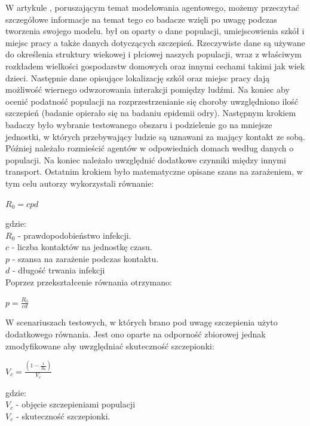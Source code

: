 W artykule \cite{bib:artykul1}, poruszającym temat modelowania agentowego, możemy przeczytać szczegółowe informacje na temat tego co badacze wzięli po uwagę podczas tworzenia swojego modelu.
był on oparty o dane populacji, umiejscowienia szkół i miejsc pracy a także danych dotyczących szczepień. Rzeczywiste dane są używane do określenia struktury wiekowej i płciowej naszych populacji, wraz z właściwym rozkładem wielkości gospodarstw domowych oraz innymi cechami takimi jak wiek dzieci. Następnie dane opisujące lokalizację szkół oraz miejsc pracy dają możliwość wiernego odwzorowania interakcji pomiędzy ludźmi. Na koniec aby ocenić podatność populacji na rozprzestrzenianie się choroby uwzględniono ilość szczepień (badanie opierało się na badaniu epidemii odry).
Następnym krokiem badaczy było wybranie testowanego obszaru i podzielenie go na mniejsze jednostki, w których przebywający ludzie są uznawani za mający kontakt ze sobą. Później należało rozmieścić agentów w odpowiednich domach według danych o populacji. Na koniec należało uwzględnić dodatkowe czynniki między innymi transport. 
Ostatnim krokiem było matematyczne opisane szans na zarażeniem, w tym celu autorzy wykorzystali równanie:

\begin{center}
$R_0 = cpd$
\end{center}

gdzie:\\
$R_0$ - prawdopodobieństwo infekcji. \\
$c$ - liczba kontaktów na jednostkę czasu. \\
$p$ - szansa na zarażenie podczas kontaktu. \\
$d$ - długość trwania infekcji \\

Poprzez przekształcenie równania otrzymano: 
\begin{center}
$ p = \frac{R_0}{cd} $
\end{center}

W scenariuszach testowych, w których brano pod uwagę szczepienia użyto dodatkowego równania. Jest ono oparte na odporność zbiorowej jednak zmodyfikowane aby uwzględniać skuteczność szczepionki:

\begin{center}
	$V_c = \frac{(1-\frac{1}{R_0})}{V_e}$
\end{center}

gdzie:\\
$V_c$ - objęcie szczepieniami populacji \\
$V_e$ - skuteczność szczepionki. \\

